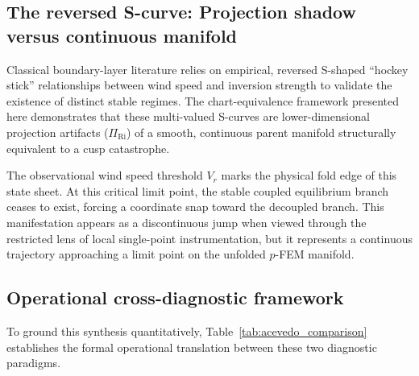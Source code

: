 \documentclass[12pt,a4paper]{article}
\begin{document}
\subsection{The reversed S-curve: Projection shadow versus continuous manifold}

Classical boundary-layer literature relies on empirical, reversed S-shaped ``hockey stick'' relationships between wind speed and inversion strength to validate the existence of distinct stable regimes. The chart-equivalence framework presented here demonstrates that these multi-valued S-curves are lower-dimensional projection artifacts ($\Pi_{\mathrm{Ri}}$) of a smooth, continuous parent manifold structurally equivalent to a cusp catastrophe.

The observational wind speed threshold $V_r$ marks the physical fold edge of this state sheet. At this critical limit point, the stable coupled equilibrium branch ceases to exist, forcing a coordinate snap toward the decoupled branch. This manifestation appears as a discontinuous jump when viewed through the restricted lens of local single-point instrumentation, but it represents a continuous trajectory approaching a limit point on the unfolded $p$-FEM manifold.

\subsection{Operational cross-diagnostic framework}

To ground this synthesis quantitatively, Table~\ref{tab:acevedo_comparison} establishes the formal operational translation between these two diagnostic paradigms.
\end{document}
